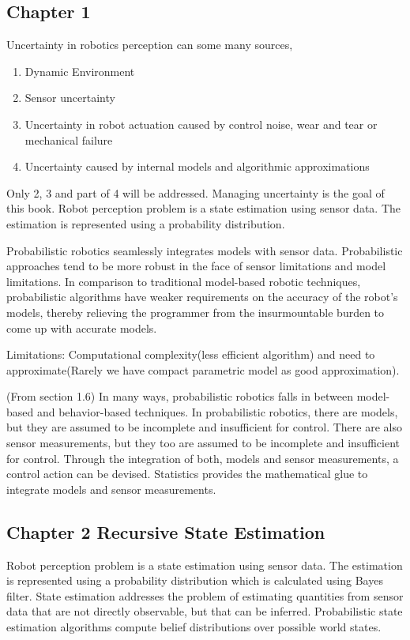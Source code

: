 \documentclass{article}
\begin{document}
\subsection{Chapter 1}
Uncertainty in robotics perception can some many sources,
\begin{enumerate}
    \item Dynamic Environment
    \item Sensor uncertainty
    \item Uncertainty in robot actuation caused by control noise, wear and tear or mechanical failure
    \item Uncertainty caused by internal models and algorithmic approximations
\end{enumerate}

Only 2, 3 and part of 4 will be addressed. Managing uncertainty is the goal of this book. Robot perception problem is a state estimation using sensor data. The estimation is represented using a probability distribution. 

Probabilistic robotics seamlessly integrates models with sensor data. Probabilistic approaches tend to be more robust in the face of
sensor limitations and model limitations. In comparison to traditional model-based robotic techniques, probabilistic algorithms have weaker requirements on the accuracy of the robot’s models, thereby relieving the programmer from the insurmountable burden to come up with accurate models.

Limitations: Computational complexity(less efficient algorithm) and need to approximate(Rarely we have compact parametric model as good approximation).

(From section 1.6) In many ways, probabilistic robotics falls in between model-based and behavior-based techniques. In probabilistic robotics, there are models, but they are assumed to be incomplete and insufficient for control. There are also sensor measurements, but they too are assumed to be incomplete and insufficient for control. Through the integration of both, models and sensor measurements, a control action can
be devised. Statistics provides the mathematical glue to integrate models and sensor measurements.

\subsection{Chapter 2 Recursive State Estimation}
Robot perception problem is a state estimation using sensor data. The estimation is represented using a probability distribution which is calculated using Bayes filter. State estimation addresses the problem of estimating quantities from sensor data that are not directly observable, but that can be inferred. Probabilistic state estimation algorithms compute belief distributions over possible world states.
\end{document}
